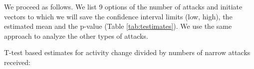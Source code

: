 \documentclass[10pt,]{scrartcl}
\begin{document}
\begin{table}
\centering\begingroup\fontsize{9}{11}\selectfont

\endgroup{}
\end{table}

\normalsize 

We proceed as follows. We list 9 options of the number of attacks and
initiate vectors to which we will save the confidence interval limits
(\textsf{low}, \textsf{high}), the estimated mean and the
\textsf{p}-value (Table \ref{tab:testimates}). We use the same approach
to analyze the other types of attacks.

\footnotesize

\normalsize

\footnotesize

\normalsize

T-test based estimates for activity change divided by numbers of narrow
attacks received:
\end{document}

